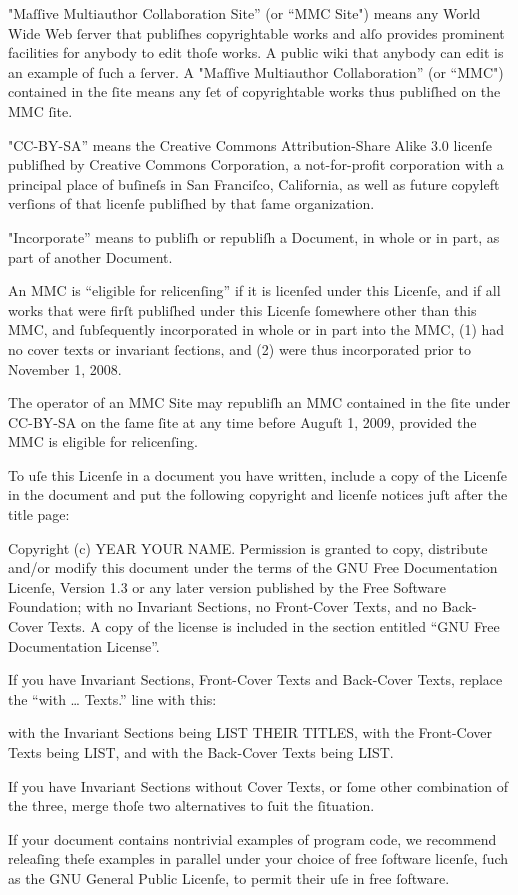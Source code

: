 
"Maſſive Multiauthor Collaboration Site” (or “MMC Site") means any
World Wide Web ſerver that publiſhes copyrightable works and alſo
provides prominent facilities for anybody to edit thoſe works. A
public wiki that anybody can edit is an example of ſuch a ſerver. A
"Maſſive Multiauthor Collaboration” (or “MMC") contained in the ſite
means any ſet of copyrightable works thus publiſhed on the MMC ſite.

"CC-BY-SA” means the Creative Commons Attribution-Share Alike 3.0 
licenſe publiſhed by Creative Commons Corporation, a not-for-profit 
corporation with a principal place of buſineſs in San Franciſco, 
California, as well as future copyleft verſions of that licenſe 
publiſhed by that ſame organization.

"Incorporate” means to publiſh or republiſh a Document, in whole or in 
part, as part of another Document.

An MMC is “eligible for relicenſing” if it is licenſed under this 
Licenſe, and if all works that were firſt publiſhed under this Licenſe 
ſomewhere other than this MMC, and ſubſequently incorporated in whole or 
in part into the MMC, (1) had no cover texts or invariant ſections, and 
(2) were thus incorporated prior to November 1, 2008.

The operator of an MMC Site may republiſh an MMC contained in the ſite
under CC-BY-SA on the ſame ſite at any time before Auguſt 1, 2009,
provided the MMC is eligible for relicenſing.



To uſe this Licenſe in a document you have written, include a copy of
the Licenſe in the document and put the following copyright and
licenſe notices juſt after the title page:

    Copyright (c)  YEAR  YOUR NAME.
    Permission is granted to copy, distribute and/or modify this document
    under the terms of the GNU Free Documentation Licenſe, Version 1.3
    or any later version published by the Free Software Foundation;
    with no Invariant Sections, no Front-Cover Texts, and no Back-Cover Texts.
    A copy of the license is included in the section entitled “GNU
    Free Documentation License”.

If you have Invariant Sections, Front-Cover Texts and Back-Cover Texts,
replace the “with … Texts.” line with this:

    with the Invariant Sections being LIST THEIR TITLES, with the
    Front-Cover Texts being LIST, and with the Back-Cover Texts being LIST.

If you have Invariant Sections without Cover Texts, or ſome other
combination of the three, merge thoſe two alternatives to ſuit the
ſituation.

If your document contains nontrivial examples of program code, we
recommend releaſing theſe examples in parallel under your choice of
free ſoftware licenſe, ſuch as the GNU General Public Licenſe,
to permit their uſe in free ſoftware.
